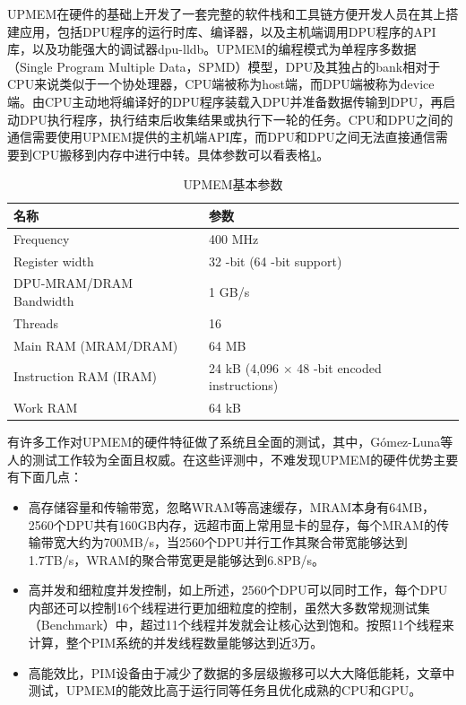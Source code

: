 UPMEM在硬件的基础上开发了一套完整的软件栈和工具链方便开发人员在其上搭建应用，包括DPU程序的运行时库、编译器，以及主机端调用DPU程序的API库，以及功能强大的调试器dpu-lldb。UPMEM的编程模式为单程序多数据（Single Program Multiple Data，SPMD）模型，DPU及其独占的bank相对于CPU来说类似于一个协处理器，CPU端被称为host端，而DPU端被称为device端。由CPU主动地将编译好的DPU程序装载入DPU并准备数据传输到DPU，再启动DPU执行程序，执行结束后收集结果或执行下一轮的任务。CPU和DPU之间的通信需要使用UPMEM提供的主机端API库，而DPU和DPU之间无法直接通信需要到CPU搬移到内存中进行中转。具体参数可以看表格\ref{UPMEMTable}。

\begin{table}[!htbp]
	\centering
	\caption{UPMEM基本参数}
	\label{UPMEMTable}
	\begin{tabular}{ll}
	  \toprule
	  名称 & 参数 \\
	  \midrule
	  Frequency & 400 MHz \\
	  Register width & 32 -bit (64 -bit support) \\
	  DPU-MRAM/DRAM Bandwidth & 1 GB/s \\
	  Threads & 16 \\
	  Main RAM (MRAM/DRAM) & 64 MB \\
	  Instruction RAM (IRAM) & 24 kB (4,096 $\times$ 48 -bit encoded instructions) \\
	  Work RAM & 64 kB \\
	  \bottomrule
	\end{tabular}
\end{table}

有许多工作对UPMEM的硬件特征做了系统且全面的测试\cite{BenchmarkingMutlu,BenchmarkingGermany,BenchmarkingUBC,BenchmarkingUPMEM,uPimulator}，其中，Gómez-Luna等人\cite{BenchmarkingMutlu}的测试工作较为全面且权威。在这些评测中，不难发现UPMEM的硬件优势主要有下面几点：
\begin{itemize}
	\item [1）] 
	高存储容量和传输带宽，忽略WRAM等高速缓存，MRAM本身有64MB，2560个DPU共有160GB内存，远超市面上常用显卡的显存，每个MRAM的传输带宽大约为700MB/s，当2560个DPU并行工作其聚合带宽能够达到1.7TB/s，WRAM的聚合带宽更是能够达到6.8PB/s。      
	\item [2）]
	高并发和细粒度并发控制，如上所述，2560个DPU可以同时工作，每个DPU内部还可以控制16个线程进行更加细粒度的控制，虽然大多数常规测试集（Benchmark）中，超过11个线程并发就会让核心达到饱和。按照11个线程来计算，整个PIM系统的并发线程数量能够达到近3万。
	\item [3）]
	高能效比，PIM设备由于减少了数据的多层级搬移可以大大降低能耗，文章\cite{BenchmarkingMutlu}中测试，UPMEM的能效比高于运行同等任务且优化成熟的CPU和GPU。
\end{itemize}

